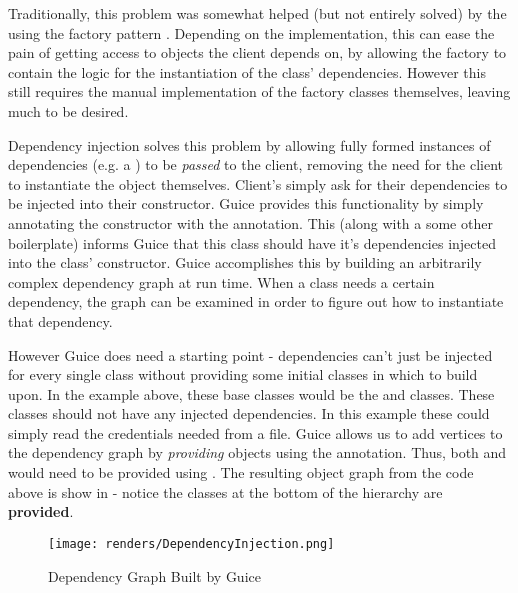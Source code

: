 

Traditionally, this problem was somewhat helped (but not entirely solved) by the using the factory pattern \cite{factoryMethodPattern}. Depending on the implementation, this can ease the pain of getting access to objects the client depends on, by allowing the factory to contain the logic for the instantiation of the class' dependencies. However this still requires the manual implementation of the factory classes themselves, leaving much to be desired.


Dependency injection solves this problem by allowing fully formed instances of dependencies (e.g. a ) to be \textit{passed} to the client, removing the need for the client to instantiate the object themselves. Client's simply ask for their dependencies to be injected into their constructor. Guice provides this functionality by simply annotating the constructor with the  annotation. This (along with a some other boilerplate) informs Guice that this class should have it's dependencies injected into the class' constructor. Guice accomplishes this by building an arbitrarily complex dependency graph at run time. When a class needs a certain dependency, the graph can be examined in order to figure out how to instantiate that dependency. 

However Guice does need a starting point - dependencies can't just be injected for every single class without providing some initial classes in which to build upon. In the example above, these base classes would be the  and  classes. These classes should not have any injected dependencies. In this example these could simply read the credentials needed from a file. Guice allows us to add vertices to the dependency graph by \textit{providing} objects using the  annotation. Thus, both  and  would need to be provided using . The resulting object graph from the code above is show in  - notice the classes at the bottom of the hierarchy are \textbf{provided}. 

\begin{figure}[H]
      \centering
      \texttt{[image: renders/DependencyInjection.png]}
      \caption{Dependency Graph Built by Guice}
      \label{fig:depGraph}
\end{figure}

